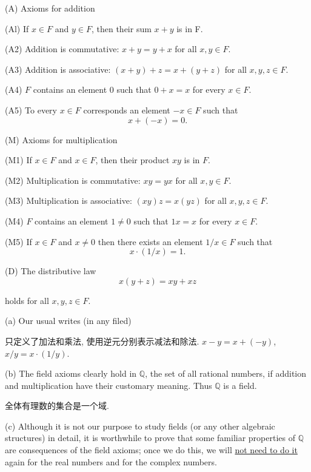\begin{myAxiom}\label{myAxiom:1.12}

(A) Axioms for addition

(Al) If $x\in F$  and $y \in F$, then their sum \(x + y\) is in F.

(A2) Addition is commutative: \(x + y=y+ x\) for all \(x, y \in F\).

(A3) Addition is associative: \((x+ y)+z = x + (y+ z)\) for all \(x, y, z \in F\).

(A4) $F$ contains an element $0$ such that $0 + x = x$ for every $x \in F$.

(A5) To every $x\in F$ corresponds an element $-x\in F$ such that
\begin{equation*}
    x+(-x)=0.
\end{equation*}

(M) Axioms for multiplication

(M1) If $x\in F$ and $x\in F$, then their product $xy$ is in $F$.

(M2) Multiplication is commutative: $xy = yx$ for all $x, y \in  F$.

(M3) Multiplication is associative: $(xy)z = x(yz)$ for all $x, y, z \in  F$.

(M4) $F$ contains an element $1 \neq 0$ such that $1x = x$ for every $x \in F$.

(M5) If $x \in F$ and $x \neq 0$ then there exists an element $1/x \in F$ such that
\begin{equation*}
    x\cdot(1/x)=1.
\end{equation*}

(D) The distributive law
\begin{equation*}
    x(y+z)=xy+ xz
\end{equation*}

holds for all $x, y, z \in F$.
\end{myAxiom}

\begin{myRemark}\label{myRemark:1.13}
(a) Our usual writes (in any filed)

只定义了加法和乘法, 使用逆元分别表示减法和除法.
$x-y = x+(-y)$, $x/y=x\cdot (1/y)$.

(b) The field axioms clearly hold in $\mathbb{Q}$, the set of all rational numbers, if
addition and multiplication have their customary meaning. Thus $\mathbb{Q}$ is a
field.

全体有理数的集合是一个域.

(c) Although it is not our purpose to study fields (or any other algebraic
structures) in detail, it is worthwhile to prove that some familiar properties
of $\mathbb{Q}$ are consequences of the field axioms; once we do this, we will \underline{not
need to do it} again for the real numbers and for the complex numbers.
\end{myRemark}

